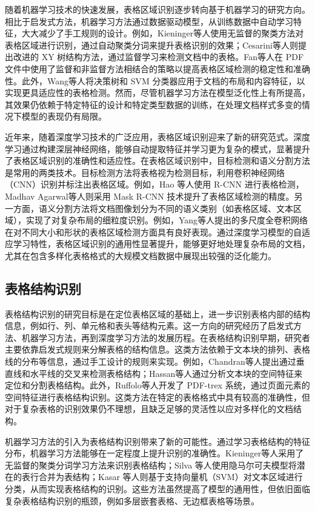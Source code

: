 \documentclass[UTF8,12pt, AutoFakeBold,fontset = founder]{ctexart}
\begin{document}
随着机器学习技术的快速发展，表格区域识别逐步转向基于机器学习的研究方向。相比于启发式方法，机器学习方法通过数据驱动模型，从训练数据中自动学习特征，大大减少了手工规则的设计。例如，Kieninger\cite{m3}等人使用无监督的聚类方法对表格区域进行识别，通过自动聚类分词来提升表格识别的效果；Cesarini\cite{m4}等人则提出改进的 XY 树结构方法，通过监督学习来检测文档中的表格。Fan\cite{m5}等人在 PDF 文件中使用了监督和非监督方法相结合的策略以提高表格区域检测的稳定性和准确性。此外，Wang\cite{m2}等人将决策树和 SVM 分类器应用于文档的布局和内容特征，以实现更具适应性的表格检测。然而，尽管机器学习方法在模型泛化性上有所提高，其效果仍依赖于特定特征的设计和特定类型数据的训练，在处理文档样式多变的情况下模型的表现仍有局限。

近年来，随着深度学习技术的广泛应用，表格区域识别迎来了新的研究范式。深度学习通过构建深层神经网络，能够自动提取特征并学习更为复杂的模式，显著提升了表格区域识别的准确性和适应性。在表格区域识别中，目标检测和语义分割方法是常用的两类技术。目标检测方法将表格视为检测目标，利用卷积神经网络（CNN）识别并标注出表格区域。例如，Hao 等人使用 R-CNN 进行表格检测，Madhav Agarwal\cite{m13}等人则采用 Mask R-CNN 技术提升了表格区域检测的精度。另一方面，语义分割方法将文档图像划分为不同的语义类别（如表格区域、文本区域），实现了对复杂布局的细粒度识别。例如，Yang\cite{m11}等人提出的多尺度全卷积网络在对不同大小和形状的表格区域检测方面具有良好表现。通过深度学习模型的自适应学习特性，表格区域识别的通用性显著提升，能够更好地处理复杂布局的文档，尤其在包含多样化表格格式的大规模文档数据中展现出较强的泛化能力。

\subsection{表格结构识别}

表格结构识别的研究目标是在定位表格区域的基础上，进一步识别表格内部的结构信息，例如行、列、单元格和表头等结构元素。这一方向的研究经历了启发式方法、机器学习方法，再到深度学习方法的发展历程。在表格结构识别早期，研究者主要依靠启发式规则来分解表格的结构信息。这类方法依赖于文本块的排列、表格线的分布等信息，通过手工设计的规则来实现。例如，Chandran\cite{m24}等人提出通过垂直线和水平线的交叉来检测表格结构；Hassan\cite{m25}等人通过分析文本块的空间特征来定位和分割表格结构。此外，Ruffolo\cite{m26}等人开发了 PDF-trex 系统，通过页面元素的空间特征进行表格结构识别。这类方法在特定的表格格式中具有较高的准确性，但对于复杂表格的识别效果仍不理想，且缺乏足够的灵活性以应对多样化的文档结构。

机器学习方法的引入为表格结构识别带来了新的可能性。通过学习表格结构的特征分布，机器学习方法能够在一定程度上提升识别的准确性。Kieninger\cite{m3}等人采用了无监督的聚类分词学习方法来识别表格结构；Silva 等人使用隐马尔可夫模型将潜在的表行合并为表结构；Kasar 等人则基于支持向量机（SVM）对文本区域进行分类，从而实现表格结构的识别。这些方法虽然提高了模型的通用性，但依旧面临复杂表格结构识别的瓶颈，例如多层嵌套表格、无边框表格等场景。
\end{document}

